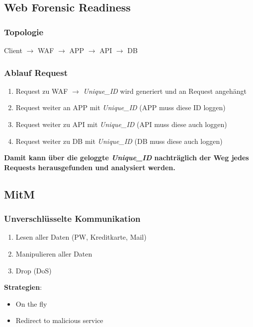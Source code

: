 \subsection{Web Forensic Readiness}

\subsubsection{Topologie}
Client $\rightarrow$ WAF $\rightarrow$ APP $\rightarrow$ API $\rightarrow$ DB

\subsubsection{Ablauf Request}
\begin{enumerate}
    \item Request zu WAF $\rightarrow$ \textit{Unique\_ID} wird generiert und an Request \glqq angehängt\grqq
    \item Request weiter an APP mit \textit{Unique\_ID} (APP muss diese ID loggen)
    \item Request weiter zu API mit \textit{Unique\_ID} (API muss diese auch loggen)
    \item Request weiter zu DB mit \textit{Unique\_ID} (DB muss diese auch loggen)\\
\end{enumerate}

\textbf{Damit kann über die geloggte \textit{Unique\_ID} nachträglich der Weg jedes Requests herausgefunden und analysiert werden.}

\newpage

\subsection{MitM}

\subsubsection{Unverschlüsselte Kommunikation}
\begin{enumerate}
    \item Lesen aller Daten (PW, Kreditkarte, Mail)
    \item Manipulieren aller Daten
    \item Drop (DoS)\\
\end{enumerate}

\textbf{Strategien}:
\begin{itemize}
    \item On the fly
    \item Redirect to malicious service
\end{itemize}

